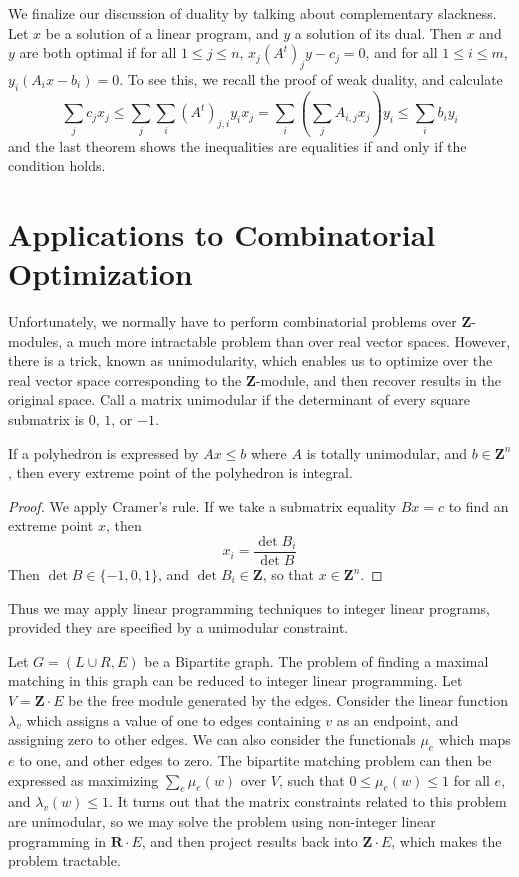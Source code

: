 We finalize our discussion of duality by talking about complementary slackness. Let $x$ be a solution of a linear program, and $y$ a solution of its dual. Then $x$ and $y$ are both optimal if for all $1 \leq j \leq n$, $x_j (A^t)_j y - c_j = 0$, and for all $1 \leq i \leq m$, $y_i (A_i x - b_i) = 0$. To see this, we recall the proof of weak duality, and calculate
%
\[ \sum_j c_j x_j \leq \sum_j \sum_i (A^t)_{j,i} y_i x_j = \sum_i \left( \sum_j A_{i,j} x_j \right) y_i \leq \sum_i b_i y_i \]
%
and the last theorem shows the inequalities are equalities if and only if the condition holds.

\chapter{Applications to Combinatorial Optimization}

Unfortunately, we normally have to perform combinatorial problems over $\mathbf{Z}$-modules, a much more intractable problem than over real vector spaces. However, there is a trick, known as unimodularity, which enables us to optimize over the real vector space corresponding to the $\mathbf{Z}$-module, and then recover results in the original space. Call a matrix unimodular if the determinant of every square submatrix is $0$, $1$, or $-1$.

\begin{theorem}
    If a polyhedron is expressed by $Ax \leq b$ where $A$ is totally unimodular, and $b \in \mathbf{Z}^n$, then every extreme point of the polyhedron is integral.
\end{theorem}
\begin{proof}
    We apply Cramer's rule. If we take a submatrix equality $Bx = c$ to find an extreme point $x$, then
    \[ x_i = \frac{\det B_i}{\det B} \]
    Then $\det B \in \{ -1, 0, 1 \}$, and $\det B_i \in \mathbf{Z}$, so that $x \in \mathbf{Z}^n$.
\end{proof}

Thus we may apply linear programming techniques to integer linear programs, provided they are specified by a unimodular constraint.

\begin{example}
    Let $G = (L \cup R, E)$ be a Bipartite graph. The problem of finding a maximal matching in this graph can be reduced to integer linear programming. Let $V = \mathbf{Z} \cdot E$ be the free module generated by the edges. Consider the linear function $\lambda_v$ which assigns a value of one to edges containing $v$ as an endpoint, and assigning zero to other edges. We can also consider the functionals $\mu_e$ which maps $e$ to one, and other edges to zero. The bipartite matching problem can then be expressed as maximizing $\sum_e \mu_e(w)$ over $V$, such that $0 \leq \mu_e(w) \leq 1$ for all $e$, and $\lambda_v(w) \leq 1$. It turns out that the matrix constraints related to this problem are unimodular, so we may solve the problem using non-integer linear programming in $\mathbf{R} \cdot E$, and then project results back into $\mathbf{Z} \cdot E$, which makes the problem tractable.
\end{example}

